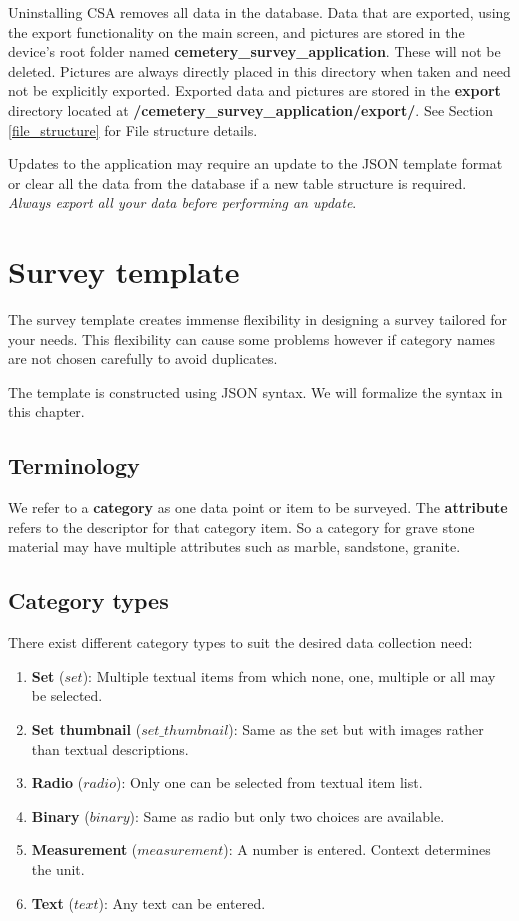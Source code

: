 \documentclass{scrreprt}
\begin{document}
Uninstalling CSA removes all data in the database. Data that are exported, using the export functionality on the main screen, and pictures are stored in the device's root folder named \textbf{cemetery_survey_application}. These will not be deleted. Pictures are always directly placed in this directory when taken and need not be explicitly exported. Exported data and pictures are stored in the \textbf{export} directory located at \textbf{/cemetery_survey_application/export/}. See Section \ref{file_structure} for File structure details.

Updates to the application may require an update to the JSON template format or clear all the data from the database if a new table structure is required. \textit{Always export all your data before performing an update}.

\chapter{Survey template}
The survey template creates immense flexibility in designing a survey tailored for your needs. This flexibility can cause some problems however if category names are not chosen carefully to avoid duplicates.

The template is constructed using JSON syntax. We will formalize the syntax in this chapter.

\section{Terminology}
We refer to a \textbf{category} as one data point or item to be surveyed. The \textbf{attribute} refers to the descriptor for that category item. So a category for grave stone material may have multiple attributes such as marble, sandstone, granite.

\section{Category types}
\label{category_types}
There exist different category types to suit the desired data collection need:

\begin{enumerate}
\item \textbf{Set} ($set$): Multiple textual items from which none, one, multiple or all may be selected.
\item \textbf{Set thumbnail} ($set\_thumbnail$): Same as the set but with images rather than textual descriptions.
\item \textbf{Radio} ($radio$): Only one can be selected from textual item list.
\item \textbf{Binary} ($binary$): Same as radio but only two choices are available.
\item \textbf{Measurement} ($measurement$): A number is entered. Context determines the unit.
\item \textbf{Text} ($text$): Any text can be entered.
\end{enumerate}
\end{document}

